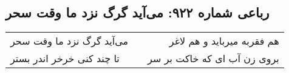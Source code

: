 \begin{center}
\section*{رباعی شماره ۹۲۲: می‌آید گرگ نزد ما وقت سحر}
\label{sec:0922}
\begin{longtable}{l p{0.5cm} r}
می‌آید گرگ نزد ما وقت سحر
&&
هم فقربه میرباید و هم لاغر
\\
تا چند کنی خرخر اندر بستر
&&
بروی زن آب ای که خاکت بر سر
\\
\end{longtable}
\end{center}
